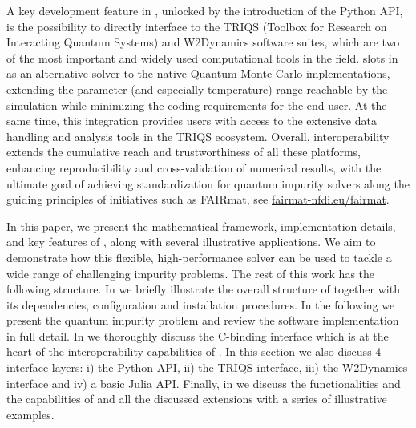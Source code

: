 \documentclass[edipack_sp.tex]{subfiles}
\begin{document}
A key development feature in \NAME, unlocked by the introduction of the Python API, 
is the possibility to directly interface to the TRIQS (Toolbox for Research on Interacting Quantum Systems) and
W2Dynamics software suites, which are two of the most important and widely used computational tools in
the field. \NAME slots in as an alternative solver to the native Quantum Monte Carlo 
implementations, extending the parameter (and especially temperature) range reachable by 
the simulation while minimizing the coding requirements for the end user.
At the same time, this integration provides \NAME users with access to the
extensive data handling and analysis tools in the TRIQS ecosystem. 
Overall, interoperability extends the cumulative reach and trustworthiness of all these platforms,
enhancing reproducibility and cross-validation of numerical results, with the ultimate goal of achieving standardization for quantum impurity solvers along the guiding principles of initiatives such as FAIRmat, see \href{https://www.fairmat-nfdi.eu/fairmat/}{fairmat-nfdi.eu/fairmat}. 

In this paper, we present the mathematical framework, implementation
details, and key features of \NAME, along with several illustrative
applications. We aim to demonstrate how this flexible,
high-performance solver can be used to tackle a wide range of
challenging impurity problems. 
The rest of this work has the following structure. In  we 
briefly illustrate the overall structure of \NAME together with its dependencies, configuration
and installation procedures. In the following   we present the quantum impurity
problem and review the software implementation in full detail. In  we thoroughly discuss the C-binding interface which is at the heart of the 
interoperability capabilities of \NAME. In this section we also discuss 4 interface layers: i) 
the Python API, ii) the TRIQS interface, iii) the W2Dynamics interface and iv) a basic Julia API.
Finally, in  we discuss the functionalities and the capabilities of \NAME and 
all the discussed extensions with a series of illustrative examples. 

\ifSubfilesClassLoaded{
  
}{}
\end{document}
